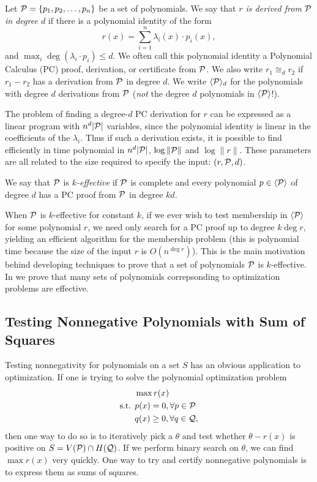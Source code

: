 \begin{definition}
Let $\mathcal P = \{p_1, p_2, \dots, p_n\}$ be a set of polynomials. We say that \emph{$r$ is derived from $\mathcal P$ in degree $d$} if there is a polynomial identity of the form
\[r(x) = \sum_{i=1}^n \lambda_i(x) \cdot p_i(x),\]
and $\max_i \deg(\lambda_i \cdot p_i) \leq d$. We often call this polynomial identity a Polynomial Calculus (PC) proof, derivation, or certificate from $\mathcal P$. We also write $r_1 \cong_d r_2$ if $r_1 - r_2$ has a derivation from $\mathcal P$ in degree $d$. We write $\langle \mathcal P \rangle_d$ for the polynomials with degree $d$ derivations from $\mathcal P$ (\emph{not} the degree $d$ polynomials in $\langle \mathcal P \rangle$!).
\end{definition}

The problem of finding a degree-$d$ PC derivation for $r$ can be expressed as a linear program with $n^d|\mathcal P|$ variables, since the polynomial identity is linear in the coefficients of the $\lambda_i$. Thus if such a derivation exists, it is possible to find efficiently in time polynomial in $n^d|\mathcal P|$, $\log \|\mathcal P\|$ and $\log \|r\|$. These parameters are all related to the size required to specify the input: $(r,\mathcal P,d)$.
\begin{definition}
We say that $\mathcal P$ is \emph{$k$-effective} if $\mathcal P$ is complete and every polynomial $p \in \langle \mathcal P \rangle$ of degree $d$ has a PC proof from $\mathcal P$ in degree $kd$.
\end{definition}
When $\mathcal P$ is $k$-effective for constant $k$, if we ever wish to test membership in $\langle \mathcal P \rangle$ for some polynomial $r$, we need only search for a PC proof up to degree $k \deg r$, yielding an efficient algorithm for the membership problem (this is polynomial time because the size of the input $r$ is $O(n^{\deg r})$). This is the main motivation behind developing techniques to prove that a set of polynomials $\mathcal P$ is $k$-effective. In  we prove that many sets of polynomials correpsonding to optimization problems are effective.

\subsection{Testing Nonnegative Polynomials with Sum of Squares}

Testing nonnegativity for polynomials on a set $S$ has an obvious application to optimization. If one is trying to solve the polynomial optimization problem
\begin{align*}
&\max r(x) \\
\text{s.t. } &p(x) = 0, \forall p \in \mathcal P \\
&q(x) \geq 0, \forall q \in \mathcal Q,
\end{align*}
then one way to do so is to iteratively pick a $\theta$ and test whether $\theta - r(x)$ is positive on $S = V(\mathcal P) \cap H(\mathcal Q)$.
If we perform binary search on $\theta$, we can find $\max r(x)$ very quickly. One way to try and certify nonnegative polynomials is to express them as sums of squares.

